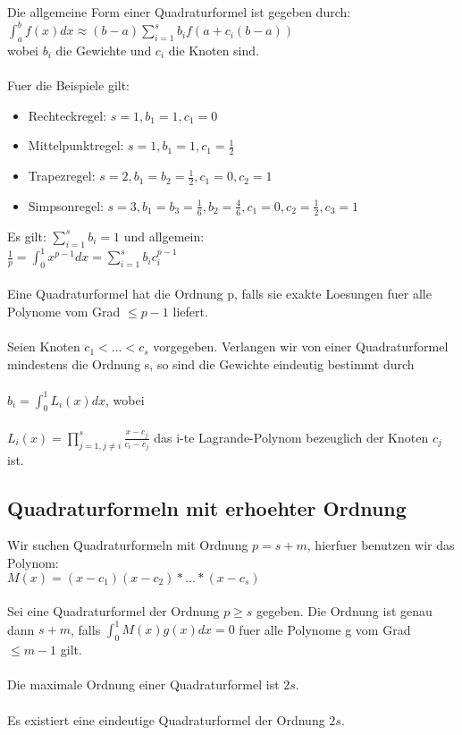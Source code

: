 \documentclass[a4paper]{scrreprt}
\begin{document}
Die allgemeine Form einer Quadraturformel ist gegeben durch:\\
$\int_a^bf(x)dx \approx (b-a)\sum_{i=1}^sb_if(a+c_i(b-a))$\\
wobei $b_i$ die Gewichte und $c_i$ die Knoten sind.\\\\

Fuer die Beispiele gilt:
\begin{itemize}
	\item Rechteckregel: $s=1,b_1=1,c_1=0$
	\item Mittelpunktregel: $s=1,b_1=1,c_1=\frac{1}{2}$
	\item Trapezregel: $s=2,b_1=b_2=\frac{1}{2},c_1=0,c_2=1$
	\item Simpsonregel: $s=3,b_1=b_3=\frac{1}{6},b_2=\frac{4}{6},c_1=0,c_2=\frac{1}{2},c_3=1$
\end{itemize}

Es gilt: $\sum_{i=1}^sb_i=1$ und allgemein:\\
$\frac{1}{p} = \int_0^1x^{p-1}dx=\sum_{i=1}^sb_ic_i^{p-1}$\\\\

Eine Quadraturformel hat die Ordnung p, falls sie exakte Loesungen fuer alle Polynome vom Grad $\leq p-1$ liefert.\\\\

Seien Knoten $c_1 < ...<c_s$ vorgegeben. Verlangen wir von einer Quadraturformel mindestens die Ordnung s, so sind die Gewichte eindeutig bestimmt durch\\\\
$b_i = \int_0^1L_i(x)dx$, wobei\\\\
$L_i(x) = \prod_{j=1,j \neq i}^s\frac{x-c_j}{c_i-c_j}$ das i-te Lagrande-Polynom bezeuglich der Knoten $c_j$ ist.

\subsection{Quadraturformeln mit erhoehter Ordnung}

Wir suchen Quadraturformeln mit Ordnung $p=s+m$, hierfuer benutzen wir das Polynom:\\
$M(x) = (x-c_1)(x-c_2)*...*(x-c_s)$\\\\


Sei eine Quadraturformel der Ordnung $p\geq s$ gegeben. Die Ordnung ist genau dann $s+m$, falls
$\int_0^1M(x)g(x)dx = 0$
fuer alle Polynome g vom Grad $\leq m-1$ gilt.\\\\

Die maximale Ordnung einer Quadraturformel ist $2s$.\\\\

Es existiert eine eindeutige Quadraturformel der Ordnung $2s$.
\end{document}
